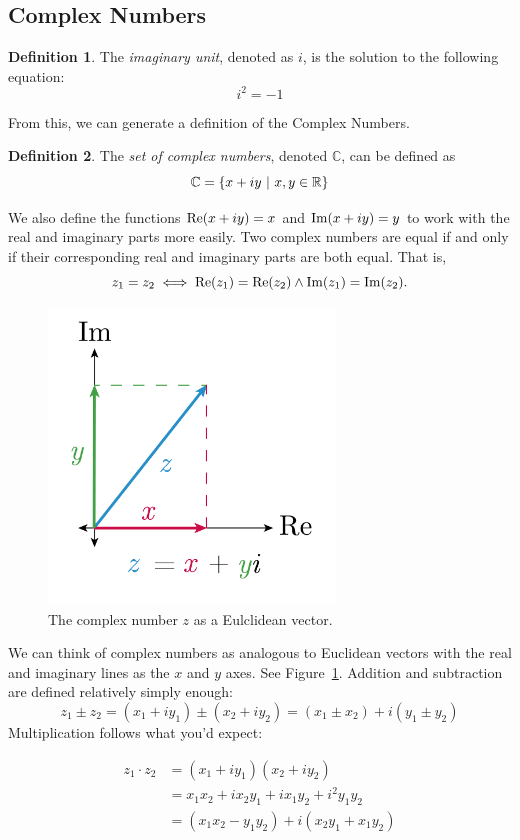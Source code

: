 \documentclass[10pt]{scrartcl}
\numberwithin{equation}{subsection}
\theoremstyle{definition}
\newtheorem{definition}{Definition}[section]
\theoremstyle{remark}
\newenvironment{definitionSR}
{
\begin{siderules}
\begin{definition}
}
{
\end{definition}
\end{siderules}
}
\newcommand{\Reals}{\mathbb{R}}
\newcommand{\Complex}{\mathbb{C}}
\newcommand{\ReP}[1]{
	\mathrm{Re}\pqty{#1}
}
\newcommand{\ImP}[1]{
	\mathrm{Im}\pqty{#1}
}
\begin{document}
\subsection{Complex Numbers}
\label{ComplexNumbers}
\begin{definitionSR}
The \emph{imaginary unit}, denoted as $i$, is the solution to the following equation:
\[
i^2 = -1
\]
\end{definitionSR}
From this, we can generate a definition of the Complex Numbers.
\begin{definitionSR}
The \emph{set of complex numbers}, denoted $\Complex$, can be defined as
\[
\Complex = \Bqty{x+iy ~ | ~ x,y \in \Reals}
\]
\end{definitionSR}
We also define the functions $\ReP{x+iy}=x$ and $\ImP{x+iy}=y$ to work with the
real and imaginary parts more easily.
Two complex numbers are equal if and only if their corresponding real and
imaginary parts are both equal. That is,
\[
z_1 = z_2 \iff \ReP{z_1} = \ReP{z_2} \wedge \ImP{z_1} = \ImP{z_2}.
\]
\begin{figure}[h]
	\centering
	\caption{The complex number $z$ as a Eulclidean vector.}
	\label{fig:complexAddition}
	\includegraphics[width=3in]{complex_number_diagram-01}
\end{figure}
We can think of complex numbers as analogous to Euclidean vectors with
the real and imaginary lines as the $x$ and $y$ axes. See Figure~\ref{fig:complexAddition}. 
Addition and subtraction are defined relatively simply enough:
\[
z_1 \pm z_2 = (x_1 + i y_1) \pm (x_2 + i y_2) = (x_1 \pm x_2) + i (y_1 \pm y_2)
\]
Multiplication follows what you'd expect:

\begin{align*}
z_1 \cdot z_2 &= (x_1 + i y_1)(x_2+ i y_2)\\
&= x_1 x_2 + i x_2 y_1 + i x_1 y_2 + i^2 y_1 y_2\\
&= (x_1 x_2 - y_1 y_2) + i(x_2 y_1 + x_1 y_2)
\end{align*}
\end{document}
